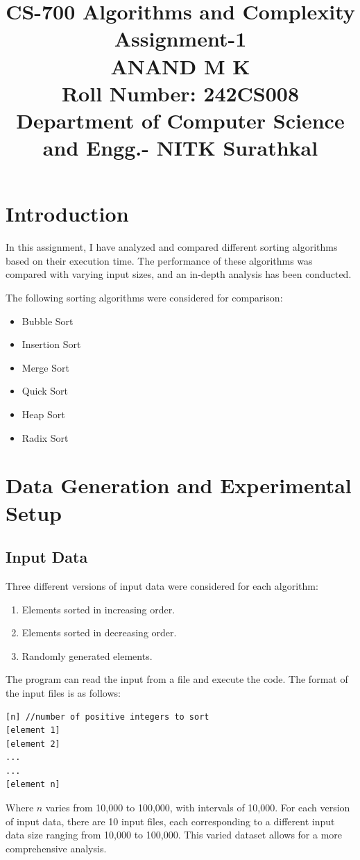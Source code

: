 \documentclass[a4paper,12pt]{report}
\title{
  \vspace{-2em} %
  \textbf{CS-700 Algorithms and Complexity} \\ %
  \large \textbf{Assignment-1} \\ %
  \vspace{1em} %
  \textbf{ANAND M K} \\ %
  Roll Number: 242CS008 \\%
  Department of Computer Science and Engg.- NITK Surathkal
}
\date{} %
\begin{document}
\maketitle

\section{Introduction}
In this assignment, I have analyzed and compared different sorting algorithms based on their execution time. The performance of these algorithms was compared with varying input sizes, and an in-depth analysis has been conducted.

The following sorting algorithms were considered for comparison:
\begin{itemize}
  \item Bubble Sort
  \item Insertion Sort
  \item Merge Sort
  \item Quick Sort
  \item Heap Sort
  \item Radix Sort
\end{itemize}

\section{Data Generation and Experimental Setup}
\subsection{Input Data}
Three different versions of input data were considered for each algorithm:
\begin{enumerate}
  \item Elements sorted in increasing order.
  \item Elements sorted in decreasing order.
  \item Randomly generated elements.
\end{enumerate}

The program can read the input from a file and execute the code. The format of the input files is as follows:
\begin{verbatim}
[n] //number of positive integers to sort
[element 1]
[element 2]
...
...
[element n]
\end{verbatim}

Where \( n \) varies from 10,000 to 100,000, with intervals of 10,000. For each version of input data, there are 10 input files, each corresponding to a different input data size ranging from 10,000 to 100,000. This varied dataset allows for a more comprehensive analysis.
\end{document}
